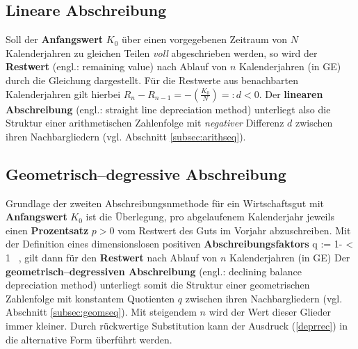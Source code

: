 \subsection{Lineare Abschreibung}
Soll der {\bf Anfangswert} $K_{0}$ \"uber einen vorgegebenen
Zeitraum von $N$ Kalenderjahren zu gleichen Teilen {\em voll\/}
abgeschrieben werden, so wird der {\bf Restwert} (engl.: remaining 
value) nach Ablauf von $n$ Kalenderjahren (in GE) durch die 
Gleichung
%
\be
{}
\ee
%
dargestellt. F\"ur die Restwerte aus benachbarten Kalenderjahren
gilt hierbei $\displaystyle R_{n}-R_{n-1}
= -\left(\frac{K_{0}}{N}\right) =: d < 0$. Der {\bf linearen
Abschreibung} (engl.: straight line depreciation method) 
unterliegt also die Struktur einer arithmetischen
Zahlenfolge mit {\em negativer\/} Differenz $d$ zwischen ihren
Nachbargliedern (vgl. Abschnitt \ref{subsec:arithseq}).

\subsection{Geometrisch--degressive Abschreibung}
Grundlage der zweiten Abschreibungsnmethode f\"ur ein
Wirtschaftsgut mit {\bf Anfangswert} $K_{0}$ ist die \"Uberlegung,
pro abgelaufenem Kalenderjahr jeweils einen {\bf Prozentsatz} $p>0$
vom Restwert des Guts im Vorjahr abzuschreiben. Mit der Definition
eines dimensionslosen positiven {\bf Abschreibungsfaktors}
%
\be
q := 1- < 1 \ ,
\ee
%
gilt dann f\"ur den {\bf Restwert} nach Ablauf von $n$
Kalenderjahren (in GE)
%
\be
{}
\ee
%
Der {\bf geometrisch--degressiven Abschreibung} (engl.: declining 
balance depreciation method) unterliegt
somit die Struktur einer geometrischen Zahlenfolge mit
konstantem Quotienten $q$ zwischen ihren Nachbargliedern
(vgl. Abschnitt \ref{subsec:geomseq}). Mit steigendem $n$ wird
der Wert dieser Glieder immer kleiner. Durch r\"uckwertige
Substitution kann der Ausdruck (\ref{deprrec}) in die
alternative Form
%
\be
{}
\ee
%
\"uberf\"uhrt werden.

